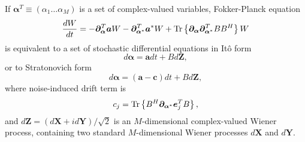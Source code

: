 \begin{theorem}
\label{thm:wigner-bec:fpe:fpe-sde-complex}
If $\bm{\alpha}^T \equiv (\alpha_1 \ldots \alpha_M)$ is a set of complex-valued variables,
Fokker-Planck equation
\[
	\frac{dW}{dt}
	= -\bm{\partial}_{\bm{\alpha}}^T \bm{a} W - \bm{\partial}_{\bm{\alpha}^*}^T \bm{a}^* W
	+ \mathrm{Tr} \left\{  \bm{\partial}_{\bm{\alpha}} \bm{\partial}_{\bm{\alpha}^*}^T B B^H  \right\} W
\]
is equivalent to a set of stochastic differential equations in It\^{o} form
\[
	d\bm{\alpha} = \bm{a} dt + B d\bm{Z},
\]
or to Stratonovich form
\[
	d\bm{\alpha} = (\bm{a} - \bm{c}) dt + B d\bm{Z},
\]
where noise-induced drift term is
\[
	c_j = \mathrm{Tr} \left\{  B^H \bm{\partial}_{\bm{\alpha}^*} \bm{e}_j^T B  \right\},
\]
and $d\bm{Z} = (d\bm{X} + id\bm{Y}) / \sqrt{2}$ is an $M$-dimensional complex-valued Wiener process,
containing two standard $M$-dimensional Wiener processes $d\bm{X}$ and $d\bm{Y}$.
\end{theorem}
